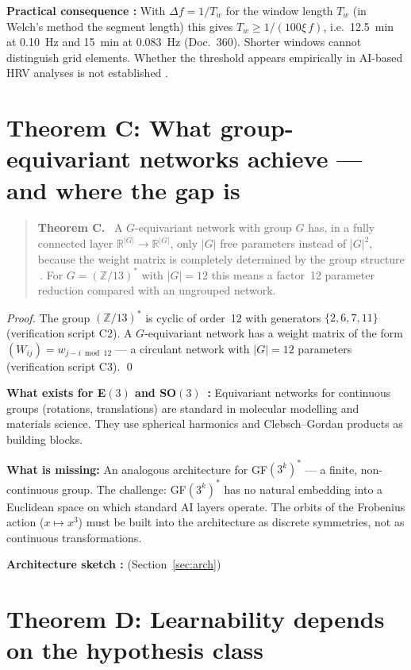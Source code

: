 \textbf{Practical consequence \KM:} With $\Delta f=1/T_w$ for the window
length $T_w$ (in Welch's method the segment length) this gives
$T_w\ge1/(100\xi\,f)$, i.e.\ 12.5~min at 0.10~Hz and 15~min at
0.083~Hz (Doc.~360). Shorter windows cannot distinguish grid elements.
Whether the threshold appears empirically in AI-based HRV analyses is not
established \SM.

\section{Theorem C: What group-equivariant networks achieve --- and where the gap is}

\begin{quote}
\textbf{Theorem C.} \BM\ A $G$-equivariant network with group $G$ has, in
a fully connected layer $\mathbb{R}^{|G|}\to\mathbb{R}^{|G|}$,
only $|G|$ free parameters instead of $|G|^2$, because the weight matrix
is completely determined by the group structure \LM\,\cite{Finzi2022}.
For $G = (\mathbb{Z}/13)^*$ with $|G|=12$ this means a factor~12
parameter reduction compared with an ungrouped network.
\end{quote}

\emph{Proof.} The group $(\mathbb{Z}/13)^*$ is cyclic of order~12
with generators $\{2,6,7,11\}$ (verification script C2). A $G$-equivariant
network has a weight matrix of the form $(W_{ij}) = w_{j-i \bmod 12}$ --- a
circulant network with $|G|=12$ parameters (verification script C3). \qed

\textbf{What exists for E$(3)$ and SO$(3)$ \LM\,\cite{Finzi2022}:}
Equivariant networks for continuous groups (rotations, translations)
are standard in molecular modelling and materials science.
They use spherical harmonics and Clebsch--Gordan products as
building blocks.

\textbf{What is missing:} An analogous architecture for GF$(3^k)^*$ --- a
finite, non-continuous group. The challenge: GF$(3^k)^*$
has no natural embedding into a Euclidean space on which
standard AI layers operate. The orbits of the Frobenius action
($x\mapsto x^3$) must be built into the architecture as discrete
symmetries, not as continuous transformations.

\textbf{Architecture sketch \SM:} (Section~\ref{sec:arch})

\section{Theorem D: Learnability depends on the hypothesis class}

